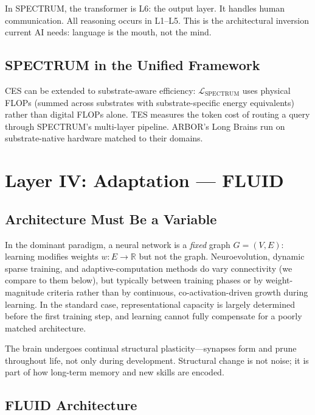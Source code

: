\documentclass[12pt]{article}
\begin{document}
In SPECTRUM, the transformer is L6: the output layer. It handles human communication. All reasoning occurs in L1--L5. This is the architectural inversion current AI needs: language is the mouth, not the mind.

\subsection{SPECTRUM in the Unified Framework}

CES can be extended to substrate-aware efficiency: $\mathcal{L}_{\text{SPECTRUM}}$ uses physical FLOPs (summed across substrates with substrate-specific energy equivalents) rather than digital FLOPs alone. TES measures the token cost of routing a query through SPECTRUM's multi-layer pipeline. ARBOR's Long Brains run on substrate-native hardware matched to their domains.

\section{Layer IV: Adaptation --- FLUID}
\label{sec:fluid}

\subsection{Architecture Must Be a Variable}

In the dominant paradigm, a neural network is a \emph{fixed} graph $G = (V, E)$: learning modifies weights $w: E \rightarrow \mathbb{R}$ but not the graph. Neuroevolution, dynamic sparse training, and adaptive-computation methods do vary connectivity (we compare to them below), but typically between training phases or by weight-magnitude criteria rather than by continuous, co-activation-driven growth during learning. In the standard case, representational capacity is largely determined before the first training step, and learning cannot fully compensate for a poorly matched architecture.

The brain undergoes continual structural plasticity---synapses form and prune throughout life, not only during development. Structural change is not noise; it is part of how long-term memory and new skills are encoded.

\subsection{FLUID Architecture}
\end{document}
